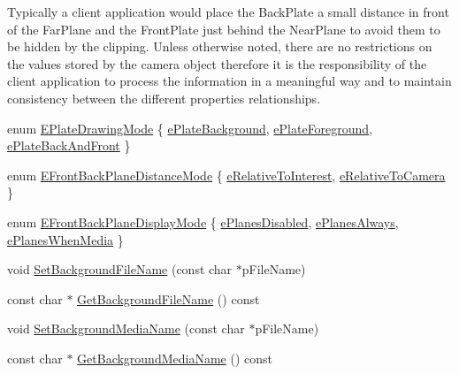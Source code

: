 Typically a client application would place the Back\+Plate a small distance in front of the Far\+Plane and the Front\+Plate just behind the Near\+Plane to avoid them to be hidden by the clipping. Unless otherwise noted, there are no restrictions on the values stored by the camera object therefore it is the responsibility of the client application to process the information in a meaningful way and to maintain consistency between the different properties relationships. \begin{DoxyCompactItemize}
\item 
enum \hyperlink{class_fbx_camera_aa4e853313a58a9cd5a88c6a35b3c46a2}{E\+Plate\+Drawing\+Mode} \{ \hyperlink{class_fbx_camera_aa4e853313a58a9cd5a88c6a35b3c46a2ad65298b6b912b7252f4a35aacf7da330}{e\+Plate\+Background}, 
\hyperlink{class_fbx_camera_aa4e853313a58a9cd5a88c6a35b3c46a2a74e46cdd10df8c161e9762d44f7ea3d8}{e\+Plate\+Foreground}, 
\hyperlink{class_fbx_camera_aa4e853313a58a9cd5a88c6a35b3c46a2ab5d341e79e4255fa68b884dc33d6a1e2}{e\+Plate\+Back\+And\+Front}
 \}
\item 
enum \hyperlink{class_fbx_camera_a79e74898d117e741c3fbd10b1ef21c79}{E\+Front\+Back\+Plane\+Distance\+Mode} \{ \hyperlink{class_fbx_camera_a79e74898d117e741c3fbd10b1ef21c79ad53d9e2ed112ce41f81d62da18788135}{e\+Relative\+To\+Interest}, 
\hyperlink{class_fbx_camera_a79e74898d117e741c3fbd10b1ef21c79a98897f48447c5d2ac67a64fe7dfdd3a3}{e\+Relative\+To\+Camera}
 \}
\item 
enum \hyperlink{class_fbx_camera_ab7b9d3e546552049a79261a444f9b44a}{E\+Front\+Back\+Plane\+Display\+Mode} \{ \hyperlink{class_fbx_camera_ab7b9d3e546552049a79261a444f9b44aaa3db9d4044e7b2028150dc2ef02692c0}{e\+Planes\+Disabled}, 
\hyperlink{class_fbx_camera_ab7b9d3e546552049a79261a444f9b44aa9ac477bc61f453af77134a3ed2d05081}{e\+Planes\+Always}, 
\hyperlink{class_fbx_camera_ab7b9d3e546552049a79261a444f9b44aab0d1040964abaff8123c109f811bdfb0}{e\+Planes\+When\+Media}
 \}
\item 
void \hyperlink{class_fbx_camera_a57a6c950efcc3bf5b5b1fde44f47fc6c}{Set\+Background\+File\+Name} (const char $\ast$p\+File\+Name)
\item 
const char $\ast$ \hyperlink{class_fbx_camera_a1de8f9aa601c8a2e12c501da3a419bc8}{Get\+Background\+File\+Name} () const
\item 
void \hyperlink{class_fbx_camera_a77dfe355ba878b5598ebcce811111585}{Set\+Background\+Media\+Name} (const char $\ast$p\+File\+Name)
\item 
const char $\ast$ \hyperlink{class_fbx_camera_a00a5854e8b375a9888eae08ae4ce7552}{Get\+Background\+Media\+Name} () const

\end{DoxyCompactItemize}
